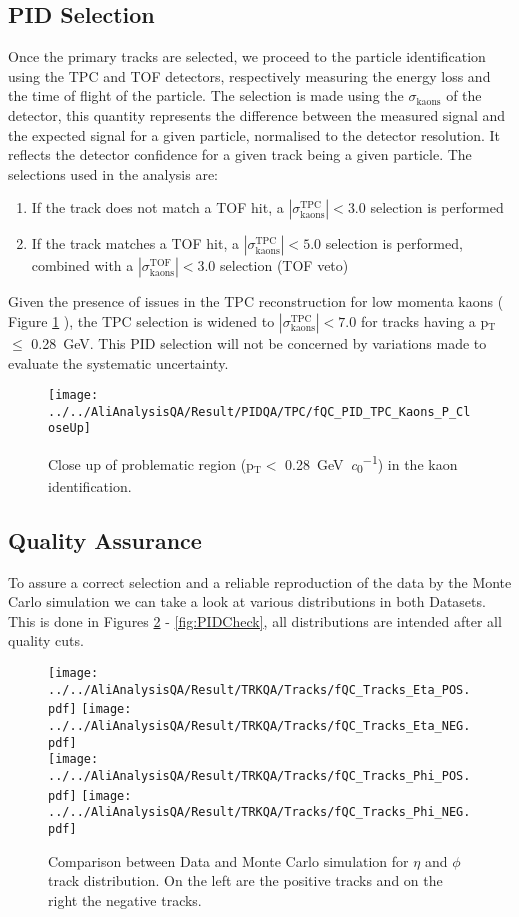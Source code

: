 \subsection{PID Selection}
Once the primary tracks are selected, we proceed to the particle identification using the TPC and TOF detectors, respectively measuring the energy loss and the time of flight of the particle. The selection is made using the $\sigma_{\text{kaons}}$ of the detector, this quantity represents the difference between the measured signal and the expected signal for a given particle, normalised to the detector resolution. It reflects the detector confidence for a given track being a given particle. The selections used in the analysis are:
\begin{enumerate}
\item If the track does not match a TOF hit, a $|\sigma_{\text{kaons}}^{\text{TPC}}| < 3.0$ selection is performed
\item If the track matches a TOF hit, a $|\sigma_{\text{kaons}}^{\text{TPC}}| < 5.0$ selection is performed, combined with a $|\sigma_{\text{kaons}}^{\text{TOF}}| < 3.0$ selection (TOF veto)
\end{enumerate}
Given the presence of issues in the TPC reconstruction for low momenta kaons ( Figure \ref{fig:TPClowcheck} ), the TPC selection is widened to $|\sigma_{\text{kaons}}^{\text{TPC}}| < 7.0$ for tracks having a 
p$_{\text{T}}$$ \leq$ \SI{0.28}{\giga\electronvolt}. This PID selection will not be concerned by variations made to evaluate the systematic uncertainty.

\begin{figure}
\texttt{[image: ../../AliAnalysisQA/Result/PIDQA/TPC/fQC\_PID\_TPC\_Kaons\_P\_CloseUp]}
\caption{Close up of problematic region (p$_{\text{T}} <$ \SI{0.28}{\giga\electronvolt\per\clight}) in the kaon identification.}
\label{fig:TPClowcheck}
\end{figure}

\subsection{Quality Assurance}
To assure a correct selection and a reliable reproduction of the data by the Monte Carlo simulation we can take a look at various distributions in both Datasets. This is done in Figures \ref{fig:EtaPhiCheck} - \ref{fig:PIDCheck}, all distributions are intended after all quality cuts.

\begin{figure}
\texttt{[image: ../../AliAnalysisQA/Result/TRKQA/Tracks/fQC\_Tracks\_Eta\_POS.pdf]}
\texttt{[image: ../../AliAnalysisQA/Result/TRKQA/Tracks/fQC\_Tracks\_Eta\_NEG.pdf]}\\
\texttt{[image: ../../AliAnalysisQA/Result/TRKQA/Tracks/fQC\_Tracks\_Phi\_POS.pdf]}
\texttt{[image: ../../AliAnalysisQA/Result/TRKQA/Tracks/fQC\_Tracks\_Phi\_NEG.pdf]}
\caption{Comparison between Data and Monte Carlo simulation for $\eta$ and $\phi$ track distribution. On the left are the positive tracks and on the right the negative tracks.}
\label{fig:EtaPhiCheck}
\end{figure}

